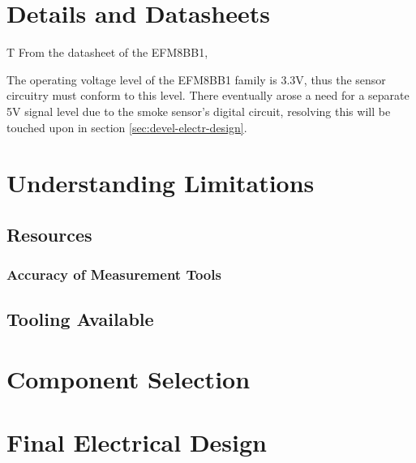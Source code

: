 \documentclass[12pt]{article}
\begin{document}
	\section{Details and Datasheets}
  T
  From the datasheet of the EFM8BB1\cite{silabs:efm8bb1},

  The operating voltage level of the EFM8BB1 family is 3.3V, thus the sensor circuitry must conform to this level. There eventually arose a need for a separate 5V signal level due to the smoke sensor's digital circuit, resolving this will be touched upon in section \ref{sec:devel-electr-design}.

	\section{Understanding Limitations}
	\subsection{Resources}
  \subsubsection{Accuracy of Measurement Tools}
	\subsection{Tooling Available}
	
	\section{Component Selection}
	
	\section{Final Electrical Design}
	
	
    \printglossaries
    
    \printbibliography[heading=bibintoc]
	
\end{document}
